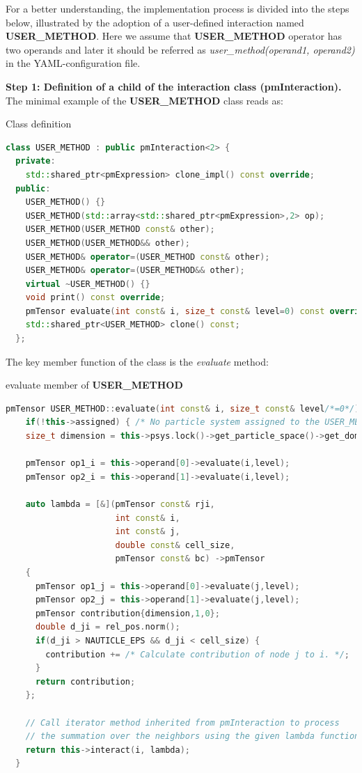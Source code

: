 \documentclass[a4paper,12pt,openany]{book}
\theoremstyle{break}
\begin{document}
For a better understanding, the implementation process is divided into the steps below, illustrated by the adoption of a user-defined interaction named \textbf{USER\_METHOD}. Here we assume that \textbf{USER\_METHOD} operator has two operands and later it should be referred as \textit{user\_method(operand1, operand2)} in the YAML-configuration file.

\textbf{Step 1: Definition of a child of the interaction class (\textbf{pmInteraction}).} \\
The minimal example of the \textbf{USER\_METHOD} class reads as:
\begin{example}{Class definition}{}
\lstset{basicstyle=\tiny}
\begin{lstlisting}[language=c++]
  class USER_METHOD : public pmInteraction<2> {
  private:
    std::shared_ptr<pmExpression> clone_impl() const override;
  public:
    USER_METHOD() {}
    USER_METHOD(std::array<std::shared_ptr<pmExpression>,2> op);
    USER_METHOD(USER_METHOD const& other);
    USER_METHOD(USER_METHOD&& other);
    USER_METHOD& operator=(USER_METHOD const& other);
    USER_METHOD& operator=(USER_METHOD&& other);
    virtual ~USER_METHOD() {}
    void print() const override;
    pmTensor evaluate(int const& i, size_t const& level=0) const override;
    std::shared_ptr<USER_METHOD> clone() const;
  };
\end{lstlisting}
\end{example}
The key member function of the class is the \textit{evaluate} method:
\begin{example}{evaluate member of \textbf{USER\_METHOD}}{}
\lstset{basicstyle=\tiny}
\begin{lstlisting}[language=c++]
  pmTensor USER_METHOD::evaluate(int const& i, size_t const& level/*=0*/) const {
    if(!this->assigned) { /* No particle system assigned to the USER_METHOD interaction. */ }
    size_t dimension = this->psys.lock()->get_particle_space()->get_domain().get_dimensions();

    pmTensor op1_i = this->operand[0]->evaluate(i,level);
    pmTensor op2_i = this->operand[1]->evaluate(i,level);

    auto lambda = [&](pmTensor const& rji,
                      int const& i, 
                      int const& j, 
                      double const& cell_size, 
                      pmTensor const& bc) ->pmTensor
    {
      pmTensor op1_j = this->operand[0]->evaluate(j,level);
      pmTensor op2_j = this->operand[1]->evaluate(j,level);
      pmTensor contribution{dimension,1,0};
      double d_ji = rel_pos.norm();
      if(d_ji > NAUTICLE_EPS && d_ji < cell_size) {
        contribution += /* Calculate contribution of node j to i. */;
      }
      return contribution;
    };

    // Call iterator method inherited from pmInteraction to process 
    // the summation over the neighbors using the given lambda function.
    return this->interact(i, lambda);
  }
\end{lstlisting}
\end{example}
\end{document}

